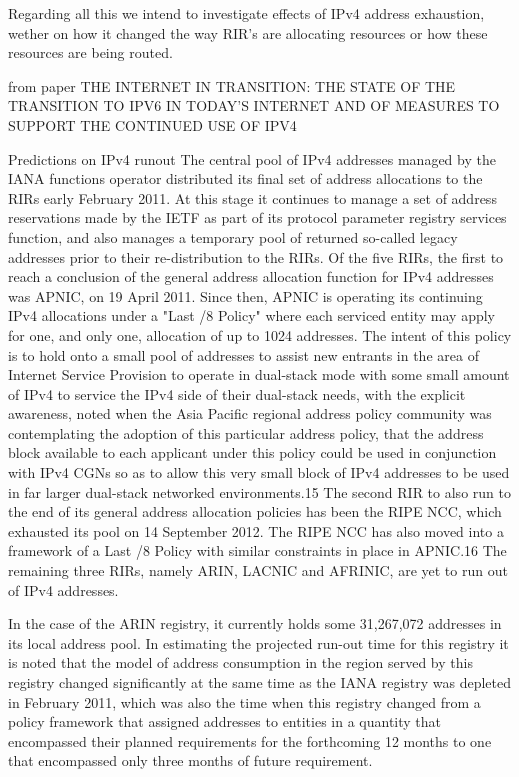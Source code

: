\documentclass[11pt,a4paper]{scrreprt}
\begin{document}
Regarding all this we intend to investigate effects of IPv4 address exhaustion, wether on how it changed the way RIR's are allocating resources or how these resources are being routed.


from paper THE INTERNET IN TRANSITION: THE STATE OF THE TRANSITION TO IPV6 IN
TODAY'S INTERNET AND OF MEASURES TO SUPPORT THE CONTINUED USE OF
IPV4 

Predictions on IPv4 runout
The central pool of IPv4 addresses managed by the IANA functions operator distributed its final
set of address allocations to the RIRs early February 2011. At this stage it continues to manage a set of
address reservations made by the IETF as part of its protocol parameter registry services function, and also
manages a temporary pool of returned so-called legacy addresses prior to their re-distribution to the RIRs.
Of the five RIRs, the first to reach a conclusion of the general address allocation function for
IPv4 addresses was APNIC, on 19 April 2011. Since then, APNIC is operating its continuing IPv4
allocations under a "Last /8 Policy" where each serviced entity may apply for one, and only one, allocation
of up to 1024 addresses. The intent of this policy is to hold onto a small pool of addresses to assist new
entrants in the area of Internet Service Provision to operate in dual-stack mode with some small amount of
IPv4 to service the IPv4 side of their dual-stack needs, with the explicit awareness, noted when the Asia
Pacific regional address policy community was contemplating the adoption of this particular address
policy, that the address block available to each applicant under this policy could be used in conjunction
with IPv4 CGNs so as to allow this very small block of IPv4 addresses to be used in far larger dual-stack
networked environments.15
The second RIR to also run to the end of its general address allocation policies has been the RIPE
NCC, which exhausted its pool on 14 September 2012. The RIPE NCC has also moved into a framework
of a Last /8 Policy with similar constraints in place in APNIC.16
The remaining three RIRs, namely ARIN, LACNIC and AFRINIC, are yet to run out of IPv4
addresses.

In the case of the ARIN registry, it currently holds some 31,267,072 addresses in its local address
pool. In estimating the projected run-out time for this registry it is noted that the model of address
consumption in the region served by this registry changed significantly at the same time as the IANA
registry was depleted in February 2011, which was also the time when this registry changed from a policy
framework that assigned addresses to entities in a quantity that encompassed their planned requirements
for the forthcoming 12 months to one that encompassed only three months of future requirement.
\end{document}
